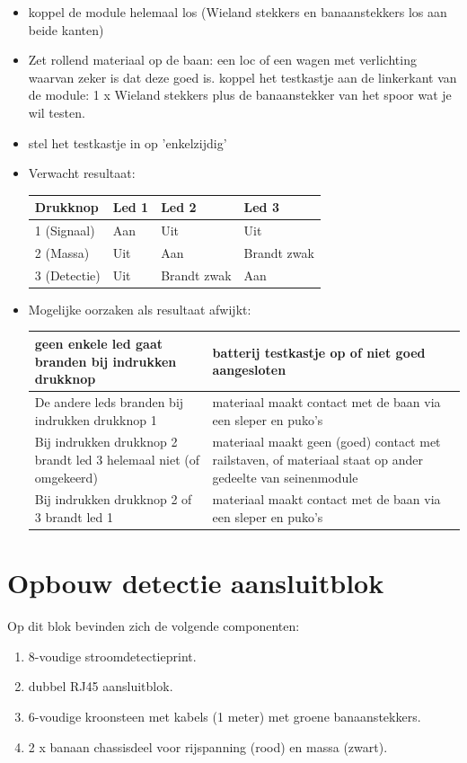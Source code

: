\documentclass[12pt,a4paper]{report}
\begin{document}
\begin{itemize}
\item koppel de module helemaal los (Wieland stekkers en banaanstekkers los aan beide kanten) 
\item Zet rollend materiaal op de baan: een loc of een wagen met verlichting waarvan zeker is dat deze goed is.
koppel het testkastje aan de linkerkant van de module: 1 x Wieland stekkers plus de banaanstekker van het spoor wat je wil testen.

\item stel het testkastje in op 'enkelzijdig' 

\item Verwacht resultaat:

\begin{tabular}{|l|l|l|l|}
\hline
Drukknop&Led 1&Led 2&Led 3\\
\hline
1 (Signaal)&Aan&Uit&Uit\\
\hline
2 (Massa)&Uit&Aan&Brandt zwak\\
\hline
3 (Detectie)&Uit&Brandt zwak&Aan\\
\hline
\end{tabular}

\item Mogelijke oorzaken als resultaat afwijkt:

\begin{tabular}{|p{8cm}|p{6cm}|}
\hline
geen enkele led gaat branden bij indrukken drukknop&batterij testkastje op of niet goed aangesloten\\
\hline
De andere leds branden bij indrukken drukknop 1&materiaal maakt contact met de baan via een sleper en puko's\\
\hline
Bij indrukken drukknop 2 brandt led 3 helemaal niet (of omgekeerd)&materiaal maakt geen (goed) contact met railstaven, of materiaal staat op ander gedeelte van seinenmodule\\
\hline
Bij indrukken drukknop 2 of 3 brandt led 1&materiaal maakt contact met de baan via een sleper en puko's\\
\hline
\end{tabular}

\end{itemize}

\chapter{Opbouw detectie aansluitblok}
\label{ch:detection}

Op dit blok bevinden zich de volgende componenten:
\begin{enumerate}
\item 8-voudige stroomdetectieprint.
\item dubbel RJ45 aansluitblok.
\item 6-voudige kroonsteen met kabels (1 meter) met groene banaanstekkers.
\item 2 x banaan chassisdeel voor rijspanning (rood) en massa (zwart).
\end{enumerate}
\end{document}
